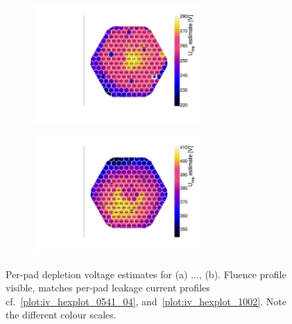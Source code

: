 \begin{figure}
	\captionsetup[subfigure]{aboveskip=-1pt,belowskip=-1pt}
	\centering
	\begin{subfigure}[b]{0.49\textwidth}
		\centering
		\includegraphics[width=0.7\textwidth]{plots/Vdep_hexplots/0541_04.pdf}
		\subcaption{
			}
			\label{plot:Vdep_hexplot_0541_04}
	\end{subfigure}
	\hfill
	\begin{subfigure}[b]{0.49\textwidth}
		\centering
		\includegraphics[width=0.7\textwidth]{plots/Vdep_hexplots/1002.pdf}
		\subcaption{
		}
		\label{plot:Vdep_hexplot_1002}
	\end{subfigure}	
	\caption{
		Per-pad depletion voltage estimates for (a) ..., (b). 
		Fluence profile visible, matches per-pad leakage current profiles cf.~\ref{plot:iv_hexplot_0541_04}, and~\ref{plot:iv_hexplot_1002}.
		Note the different colour scales.
	}
\end{figure}